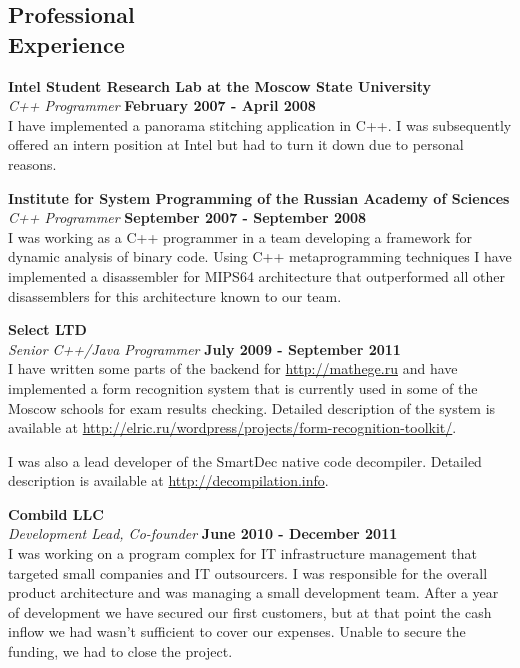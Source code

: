 \documentclass[margin,line]{CV}
\begin{document}
\begin{resume}
    \section{\mysidestyle Professional\\Experience}
    \textbf{Intel Student Research Lab at the Moscow State University} \vspace{2mm}\\\vspace{1mm}%
    \textsl{C++ Programmer} \hfill \textbf{February 2007 - April 2008}\\
    I have implemented a panorama stitching application in C++. I was subsequently offered an intern position 
	at Intel but had to turn it down due to personal reasons.

	
    \textbf{Institute for System Programming of the Russian Academy of Sciences} \vspace{2mm}\\\vspace{1mm}%
    \textsl{C++ Programmer} \hfill \textbf{September 2007 - September 2008}\\
    I was working as a C++ programmer in a team developing a framework for dynamic analysis of binary code.
	Using C++ metaprogramming techniques I have implemented a disassembler for MIPS64 architecture that 
	outperformed all other disassemblers for this architecture known to our team.


    \textbf{Select LTD} \vspace{2mm}\\\vspace{1mm}%
    \textsl{Senior C++/Java Programmer} \hfill \textbf{July 2009 - September 2011}\\
    I have written some parts of the backend for \url{http://mathege.ru} and have implemented a form recognition system
    that is currently used in some of the Moscow schools for exam results checking. Detailed description of the system is
    available at \url{http://elric.ru/wordpress/projects/form-recognition-toolkit/}. 
	
	I was also a lead developer of the SmartDec native code decompiler. Detailed description is available at 
	\url{http://decompilation.info}.

	\textbf{Combild LLC} \vspace{2mm}\\\vspace{1mm}%
	\textsl{Development Lead, Co-founder} \hfill \textbf{June 2010 - December 2011}\\
    I was working on a program complex for IT infrastructure management that targeted small companies and IT outsourcers. I was responsible for the overall product architecture and was managing a small development team. After a year of development we have secured our first customers, but at that point the cash inflow we had wasn't sufficient to cover our expenses. Unable to secure the funding, we had to close the project.


\end{resume}
\end{document}
